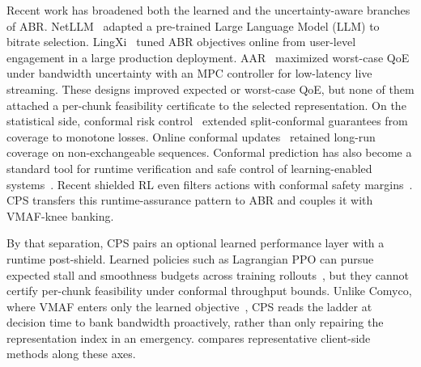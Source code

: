 Recent work has broadened both the learned and the uncertainty-aware branches of ABR.
NetLLM~\cite{wu2024netllm} adapted a pre-trained Large Language Model (LLM) to bitrate selection.
LingXi~\cite{jia2025lingxi} tuned ABR objectives online from user-level engagement in a large production deployment.
AAR~\cite{chen2025aar} maximized worst-case QoE under bandwidth uncertainty with an MPC controller for low-latency live streaming.
These designs improved expected or worst-case QoE, but none of them attached a per-chunk feasibility certificate to the selected representation.
On the statistical side, conformal risk control~\cite{angelopoulos2024crc} extended split-conformal guarantees from coverage to monotone losses.
Online conformal updates~\cite{angelopoulos2024online} retained long-run coverage on non-exchangeable sequences.
Conformal prediction has also become a standard tool for runtime verification and safe control of learning-enabled systems~\cite{lindemann2025cpsurvey}.
Recent shielded RL even filters actions with conformal safety margins~\cite{kwon2026adaptiveshielding}.
CPS transfers this runtime-assurance pattern to ABR and couples it with VMAF-knee banking.

By that separation, CPS pairs an optional learned performance layer with a runtime post-shield.
Learned policies such as Lagrangian PPO can pursue expected stall and smoothness budgets across training rollouts~\cite{paternain2019dual,hu2023corel}, but they cannot certify per-chunk feasibility under conformal throughput bounds.
Unlike Comyco, where VMAF enters only the learned objective~\cite{huang2019comyco}, CPS reads the ladder at decision time to bank bandwidth proactively, rather than only repairing the representation index in an emergency.
 compares representative client-side methods along these axes.

